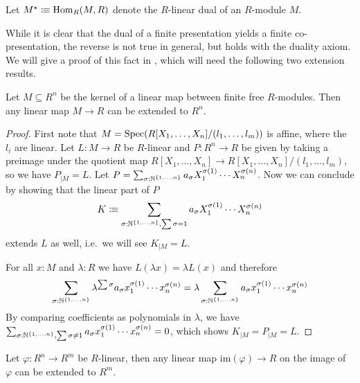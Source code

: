 \begin{definition}
  Let $M^\star\vcentcolon\mspace{-1.2mu}\equiv \mathrm{Hom}_{R}(M,R)$ denote the $R$-linear dual of an $R$-module $M$.
\end{definition}

While it is clear that the dual of a finite presentation yields a finite co-presentation, the reverse is not true in general, but holds with the duality axiom.
We will give a proof of this fact in , which will need the following two extension results.

\begin{lemma}
  \label{extend-from-kernel}
  Let $M\subseteq R^n$ be the kernel of a linear map between finite free $R$-modules.
  Then any linear map $M\to R$ can be extended to $R^n$.
\end{lemma}

\begin{proof}
  First note that $M=\operatorname{Spec}(R[X_1,\dots,X_n]/(l_1,\dots,l_m))$ is affine, where the $l_i$ are linear.
  Let $L:M\to R$ be $R$-linear and $P:R^n\to R$ be given by taking a preimage under the quotient map $R[X_1,\dots,X_n]\to R[X_1,\dots,X_n]/(l_1,\dots,l_m)$,
  so we have $P_{\vert M}=L$.
  Let $P=\sum_{\sigma:\mathbb{N}^{\{1,\dots,n\}}}a_\sigma X_1^{\sigma(1)}\cdots X_n^{\sigma(n)}$.
  Now we can conclude by showing that the linear part of $P$
  \[
    K\vcentcolon\mspace{-1.2mu}\equiv \sum_{\sigma:\mathbb{N}^{\{1,\dots,n\}}, \sum \sigma =1}a_\sigma X_1^{\sigma(1)}\cdots X_n^{\sigma(n)}
  \]
  extends $L$ as well, i.e.\ we will see $K_{\vert M}=L$.
  
  For all $x:M$ and $\lambda : R$ we have $L(\lambda x)=\lambda L(x)$ and therefore
  \[
    \sum_{\sigma:\mathbb{N}^{\{1,\dots,n\}}}\lambda^{\sum\sigma} a_\sigma x_1^{\sigma(1)}\cdots x_n^{\sigma(n)}=\lambda \sum_{\sigma:\mathbb{N}^{\{1,\dots,n\}}} a_\sigma x_1^{\sigma(1)}\cdots x_n^{\sigma(n)}
  \]
  By comparing coefficients as polynomials in $\lambda$, we have $\sum_{\sigma:\mathbb{N}^{\{1,\dots,n\}}, \sum \sigma \neq 1}a_\sigma x_1^{\sigma(1)}\cdots x_n^{\sigma(n)}=0$,
  which shows $K_{\vert M}=P_{\vert M}=L$.
\end{proof}

\begin{lemma}
  \label{extend-from-image}
  Let $\varphi:R^n\to R^m$ be $R$-linear, then any linear map $\mathrm{im}(\varphi)\to R$ on the image of $\varphi$ can be extended to $R^m$.
\end{lemma}

